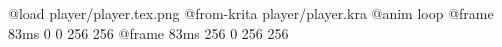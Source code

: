 @load player/player.tex.png
@from-krita player/player.kra
@anim loop
	@frame 83ms 0 0 256 256
	@frame 83ms 256 0 256 256
